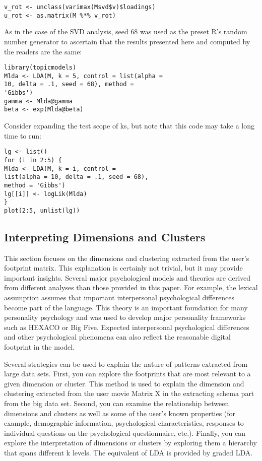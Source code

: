 \begin{verbatim}
v_rot <- unclass(varimax(Msvd$v)$loadings)
u_rot <- as.matrix(M %*% v_rot)
\end{verbatim}

As in the case of the SVD analysis, seed 68 was used as the preset
 R’s random number generator to ascertain that the results 
presented here and computed by the readers are the same:

\begin{verbatim}
library(topicmodels)
Mlda <- LDA(M, k = 5, control = list(alpha =
10, delta = .1, seed = 68), method =
'Gibbs')
gamma <- Mlda@gamma
beta <- exp(Mlda@beta)
\end{verbatim}

Consider expanding the test scope of ks, but note that this code 
may take a long time to run:

\begin{verbatim}
lg <- list()
for (i in 2:5) {
Mlda <- LDA(M, k = i, control =
list(alpha = 10, delta = .1, seed = 68),
method = 'Gibbs')
lg[[i]] <- logLik(Mlda)
}
plot(2:5, unlist(lg))
\end{verbatim}

\subsection{Interpreting Dimensions and Clusters}

This section focuses on the dimensions and clustering extracted 
from the user's footprint matrix. This explanation is certainly not
 trivial, but it may provide important insights. Several major 
psychological models and theories are derived from different 
analyses than those provided in this paper. For example, the 
lexical assumption assumes that important interpersonal 
psychological differences become part of the language. This theory
 is an important foundation for many personality psychology and was
 used to develop major personality frameworks such as HEXACO or Big
 Five. Expected interpersonal psychological differences and other 
psychological phenomena can also reflect the reasonable digital 
footprint in the model.

Several strategies can be used to explain the nature of patterns 
extracted from large data sets. First, you can explore the 
footprints that are most relevant to a given dimension or cluster.
 This method is used to explain the dimension and clustering 
extracted from the user movie Matrix X in the extracting schema 
part from the big data set. Second, you can examine the 
relationship between dimensions and clusters as well as some of 
the user's known properties (for example, demographic information,
 psychological characteristics, responses to individual questions 
on the psychological questionnaire, etc.). Finally, you can 
explore the interpretation of dimensions or clusters by exploring 
them a hierarchy that spans different k levels. The equivalent of 
LDA is provided by graded LDA.


